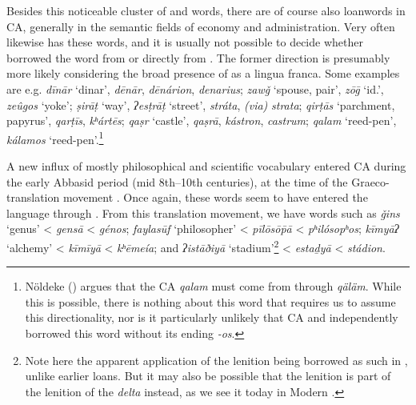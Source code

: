 \documentclass[output=paper]{langsci/langscibook}
\begin{document}
Besides this noticeable cluster of  and  words, there are of course also  {loanwords} in CA, generally in the semantic fields of economy and administration. Very often  likewise has these words, and it is usually not possible to decide whether  borrowed the word from  or directly from . The former direction is presumably more likely considering the broad presence of  as a lingua franca. Some examples are e.g. \textit{dīnār} ‘dinar’,  \textit{dēnār},  \textit{dēnárion},  \textit{denarius}; \textit{zawǧ} ‘spouse, pair’,  \textit{zōḡ} ‘id.’,  \textit{zeûgos} ‘yoke’; \textit{ṣirāṭ} ‘way’,  \textit{ʔesṭrāṭ} ‘street’,  \textit{stráta},  \textit{(via)} \textit{strata}; \textit{qirṭās} ‘parchment, papyrus’,  \textit{qarṭīs},  \textit{kʰártēs}; \textit{qaṣr} ‘castle’,  \textit{qaṣrā},  \textit{kástron},  \textit{castrum}; \textit{qalam} ‘reed-pen’,  \textit{kálamos} ‘reed-pen’.\footnote{Nöldeke (\citeyear[50]{Nöldeke1910}) argues that the CA \textit{qalam} must come from  through  \textit{qäläm}. While this is possible, there is nothing about this word that requires us to assume this directionality, nor is it particularly unlikely that CA and  independently borrowed this word without its  ending \textit{-os}.}

A new influx of mostly philosophical and scientific  vocabulary entered CA during the early Abbasid period (mid 8th–10th centuries), at the time of the Graeco- translation movement \citep{Gutas1998}. Once again, these words seem to have entered the language through  \citep{Gutas2011}. From this translation movement, we have words such as \textit{ǧins} ‘genus’ <  \textit{gensā} <  \textit{génos}; \textit{faylasūf} ‘philosopher’ <  \textit{pīlōsōp̄ā} <  \textit{pʰilósopʰos}; \textit{kīmyāʔ} ‘alchemy’ <  \textit{kīmīyā} <  \textit{kʰēmeía}; and \textit{ʔistāðiyā} ‘stadium’\footnote{Note here the apparent application of the  lenition being borrowed as such in , unlike earlier loans. But it may also be possible that the lenition is part of the  lenition of the \textit{delta} instead, as we see it today in Modern .} <  \textit{estaḏyā} <  \textit{stádion}.
\end{document}
